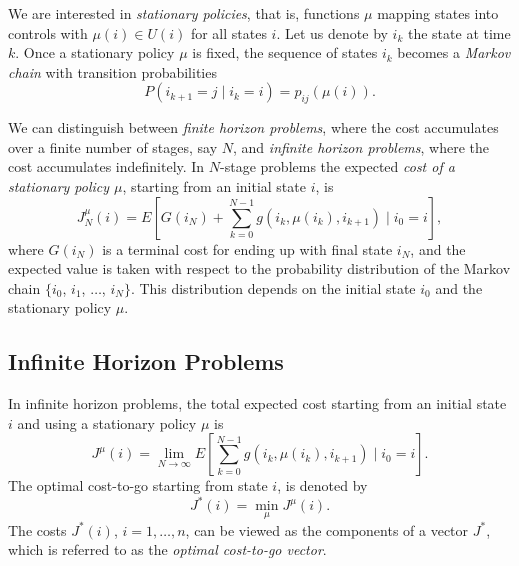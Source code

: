We are interested in \emph{stationary policies}, that is, functions $\mu$
mapping states into controls with $\mu(i) \in U(i)$ for all states $i$.
Let us denote by $i_k$ the state at time $k$. Once a stationary policy $\mu$ is fixed, the sequence of states $i_k$ becomes a \emph{Markov chain} with transition probabilities
$$P(i_{k+1} = j \mid i_k = i) = p_{ij}(\mu(i)).$$

We can distinguish between \emph{finite horizon problems}, where the cost accumulates over a finite number of stages, say $N$, and \emph{infinite horizon problems}, where the cost accumulates indefinitely. In $N$-stage problems the expected \emph{cost of a stationary policy $\mu$}, starting from an initial state $i$, is
$$J^\mu_N(i) = E \left [G(i_N) + \sum^{N-1}_{k=0}g(i_k,\mu(i_k),i_{k+1}) \mid i_0=i \right ],$$
where $G(i_N)$ is a terminal cost for ending up with final state $i_N$, and the expected value is taken with respect to the probability distribution of the Markov chain $\{i_0$, $i_1$, $\ldots$, $i_N\}$.
This distribution depends on the initial state $i_0$ and the stationary policy $\mu$. 






\subsection{Infinite Horizon Problems}
In infinite horizon problems, the total expected cost starting from an initial state $i$ and using a stationary policy $\mu$ is
$$J^\mu(i) = \lim_{N \rightarrow \infty} E \left [\sum^{N-1}_{k=0}g(i_k,\mu(i_k),i_{k+1}) \mid i_0=i \right ].$$
The optimal cost-to-go starting from state $i$, is denoted by 
$$J^*(i) = \min_\mu J^\mu(i).$$
The costs $J^*(i)$, $i = 1,\ldots,n$, can be viewed as the components of a vector $J^*$, which is referred to as the \emph{optimal cost-to-go vector}.

